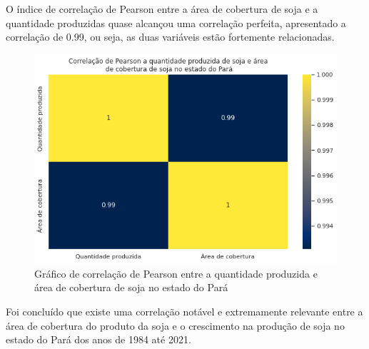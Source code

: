 O índice de correlação de Pearson entre a área de cobertura de soja e a quantidade produzidas quase alcançou uma correlação perfeita, apresentado a correlação de 0.99, ou seja, as duas variáveis estão fortemente relacionadas.

\begin{figure}[hbt!]
    \centering
    \includegraphics[width=0.6\columnwidth]{src/plots/plot_correlacao-soja.png}
    \centering
    \caption{Gráfico de correlação de Pearson entre a quantidade produzida e área de cobertura de soja no estado do Pará}
    \label{fig:correlacao-cobertura_pastagem-numero_cabecas}
\end{figure}

Foi concluído que existe uma correlação notável e extremamente relevante entre a área de cobertura do produto da soja e o crescimento na produção de soja no estado do Pará dos anos de 1984 até 2021.

